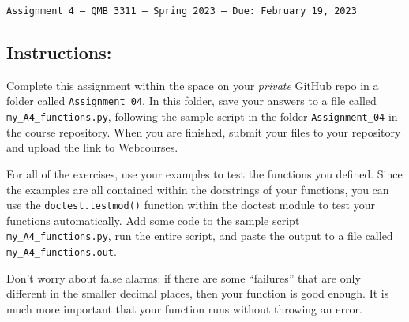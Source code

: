 \documentclass[11pt]{exam}
\begin{document}
\texttt{Assignment 4 --- QMB 3311 ---  Spring 2023  --- Due: February 19, 2023}

\subsection*{Instructions:}

Complete this assignment within the space on your \textit{private} GitHub repo in a folder called \texttt{Assignment\_04}. In this folder, save your answers to a file called \texttt{my\_A4\_functions.py}, following the sample script in the folder \texttt{Assignment\_04} in the course repository. When you are finished, submit your files to your repository and upload the link to Webcourses.

For all of the exercises, use your examples to test the functions you defined. Since the examples are all contained within the docstrings of your functions, you can use the
\texttt{doctest.testmod()} function within the doctest module to test your functions automatically. Add some code to the sample script \texttt{my\_A4\_functions.py}, run the entire script, and paste the output to a file called \texttt{my\_A4\_functions.out}.

Don't worry about false alarms: if there are some ``failures'' that are only different in the smaller decimal places, then your function is good enough. It is much more important that your function runs without throwing an error.
\end{document}
